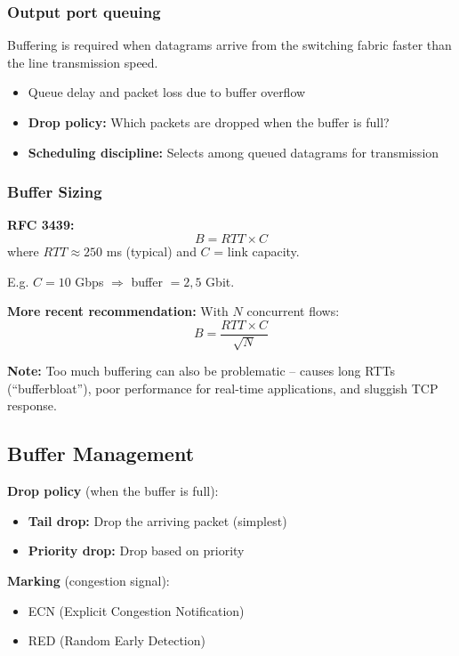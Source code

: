 \subsubsection{Output port queuing}

\begin{keybox}
Buffering is required when datagrams arrive from the switching fabric faster than the line transmission speed.
\begin{itemize}[noitemsep]
    \item Queue delay and packet loss due to buffer overflow
    \item \textbf{Drop policy:} Which packets are dropped when the buffer is full?
    \item \textbf{Scheduling discipline:} Selects among queued datagrams for transmission
\end{itemize}
\end{keybox}

\subsubsection{Buffer Sizing}

\begin{formulabox}
\textbf{RFC 3439:}
\[
B = RTT \times C
\]
where $RTT \approx 250$ ms (typical) and $C$ = link capacity.

\medskip
E.g. $C = 10$ Gbps $\Rightarrow$ buffer $= 2{,}5$ Gbit.

\medskip
\textbf{More recent recommendation:} With $N$ concurrent flows:
\[
B = \frac{RTT \times C}{\sqrt{N}}
\]

\textbf{Note:} Too much buffering can also be problematic -- causes long RTTs (``bufferbloat''), poor performance for real-time applications, and sluggish TCP response.
\end{formulabox}

\subsection{Buffer Management}

\begin{keybox}
\textbf{Drop policy} (when the buffer is full):
\begin{itemize}[noitemsep]
    \item \textbf{Tail drop:} Drop the arriving packet (simplest)
    \item \textbf{Priority drop:} Drop based on priority
\end{itemize}

\textbf{Marking} (congestion signal):
\begin{itemize}[noitemsep]
    \item ECN (Explicit Congestion Notification)
    \item RED (Random Early Detection)
\end{itemize}
\end{keybox}

